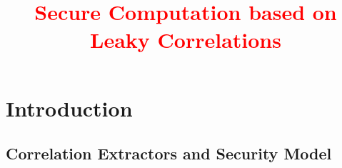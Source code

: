 \documentclass{llncs}
\title{\textcolor{red}{Secure Computation based on Leaky Correlations}}
\date{}
\author{}
\institute{}
\begin{document}
\maketitle



\tableofcontents
\section{Introduction}
\subsection{Correlation Extractors and Security Model}




\end{document}
